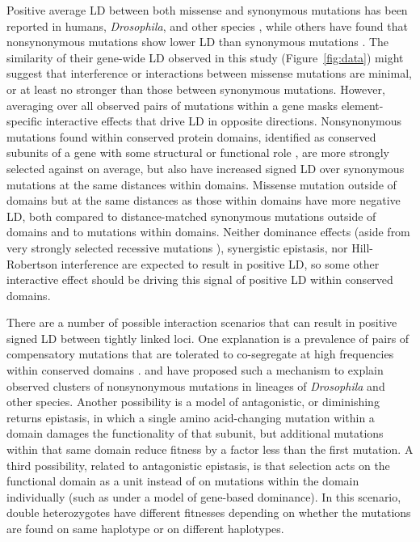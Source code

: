 \documentclass[]{article}
\begin{document}
Positive average LD between both missense and synonymous mutations has been
reported in humans, \emph{Drosophila}, and other species
\citep{Sohail2017-zq,Sandler2021-of}, while others have found that
nonsynonymous mutations show lower LD than synonymous mutations
\citep{Garcia2021-zn}. The similarity of their gene-wide LD observed in this
study (Figure~\ref{fig:data}) might suggest that interference or interactions
between missense mutations are minimal, or at least no stronger than those
between synonymous mutations. However, averaging over all observed pairs of
mutations within a gene masks element-specific interactive effects that drive
LD in opposite directions. Nonsynonymous mutations found within conserved
protein domains, identified as conserved subunits of a gene with some
structural or functional role \citep{Stanek2020-pa}, are more strongly selected
against on average, but also have increased signed LD over synonymous mutations
at the same distances within domains. Missense mutation outside of domains but
at the same distances as those within domains have more negative LD, both
compared to distance-matched synonymous mutations outside of domains and to
mutations within domains.  Neither dominance effects (aside from very strongly
selected recessive mutations \citep{Roze2021-cf}), synergistic epistasis, nor
Hill-Robertson interference are expected to result in positive LD, so some
other interactive effect should be driving this signal of positive LD within
conserved domains.

There are a number of possible interaction scenarios that can result in
positive signed LD between tightly linked loci. One explanation is a prevalence
of pairs of compensatory mutations that are tolerated to co-segregate at high
frequencies within conserved domains \citep{Yeang2007-gj,Ivankov2014-tn}.
\citet{Callahan2011-ac} and \citet{Taverner2020-lk} have proposed such a
mechanism to explain observed clusters of nonsynonymous mutations in lineages
of \emph{Drosophila} and other species. Another possibility is a model of
antagonistic, or diminishing returns epistasis, in which a single amino
acid-changing mutation within a domain damages the functionality of that
subunit, but additional mutations within that same domain reduce fitness by a
factor less than the first mutation. A third possibility, related to
antagonistic epistasis, is that selection acts on the functional domain as a
unit instead of on mutations within the domain individually (such as under a
model of gene-based dominance). In this scenario, double heterozygotes have
different fitnesses depending on whether the mutations are found on same
haplotype or on different haplotypes.
\end{document}
